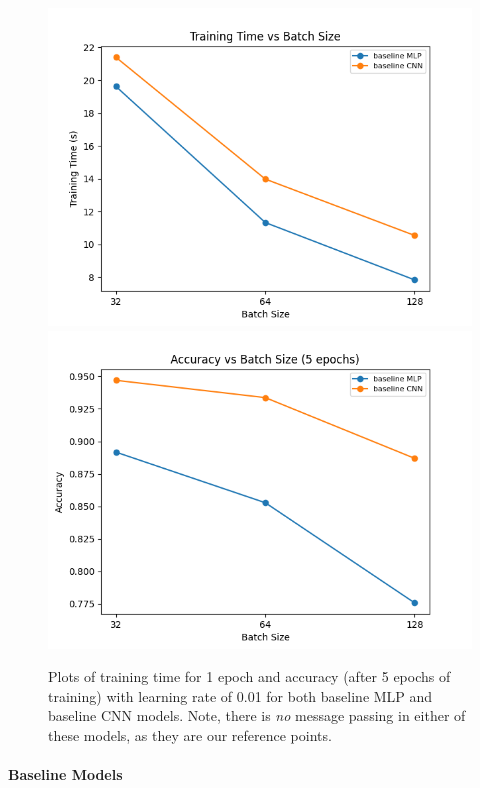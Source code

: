\documentclass{article}
\begin{document}
\begin{figure}[!h]
    \centering
    \includegraphics[scale=0.5]{base_time_bs}
    \includegraphics[scale=0.5]{base_acc_bs}
    \caption{Plots of training time for 1 epoch and accuracy (after 5 epochs of training) with learning rate of 0.01 for both baseline MLP and baseline CNN models. Note, there is \textit{no} message passing in either of these models, as they are our reference points.}
    \label{fig:base_bs}
\end{figure}

\paragraph{Baseline Models}
\end{document}
